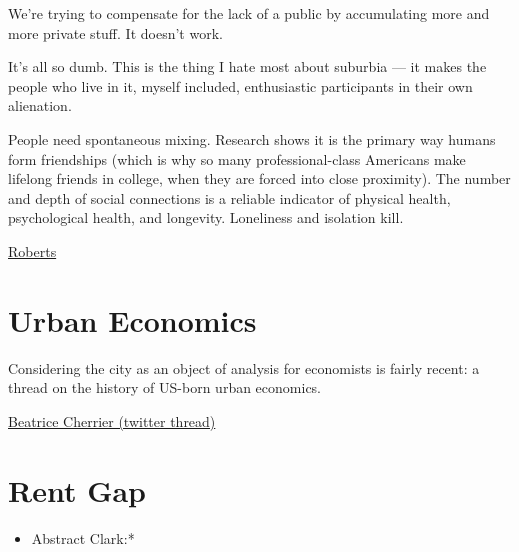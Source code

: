 \documentclass[
]{book}
\providecommand{\tightlist}{%
  \setlength{\itemsep}{0pt}\setlength{\parskip}{0pt}}
\begin{document}
We're trying to compensate for the lack of a public by accumulating more and more private stuff.
It doesn't work.

It's all so dumb. This is the thing I hate most about suburbia --- it makes the people who live in it, myself included, enthusiastic participants in their own alienation.

People need spontaneous mixing. Research shows it is the primary way humans form friendships (which is why so many professional-class Americans make lifelong friends in college, when they are forced into close proximity). The number and depth of social connections is a reliable indicator of physical health, psychological health, and longevity. Loneliness and isolation kill.

\href{https://www.volts.wtf/p/a-rant-about-lawns-in-america}{Roberts}

\hypertarget{urban-economics}{%
\chapter{Urban Economics}\label{urban-economics}}

Considering the city as an object of analysis for economists is fairly recent:
a thread on the history of US-born urban economics.

\href{https://twitter.com/Undercoverhist/status/1372999869204467718}{Beatrice Cherrier (twitter thread)}

\hypertarget{rent-gap}{%
\chapter{Rent Gap}\label{rent-gap}}

\begin{itemize}
\tightlist
\item
  Abstract Clark:*
\end{itemize}
\end{document}
